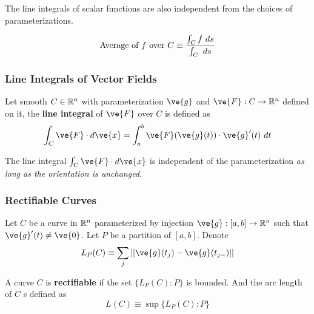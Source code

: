 \documentclass[11pt]{article}
\begin{document}
			\begin{remark}
				The line integrals of scalar functions are also independent from the choices of parameterizations.
			\end{remark}
			
			\begin{definition}
				\begin{equation}
					\text{{Average of $f$ over $C$}} \equiv \frac{\int_C f\ ds}{\int_C\ ds}
				\end{equation}
			\end{definition}
			
		\subsubsection{Line Integrals of Vector Fields}
			\begin{definition} Let smooth $C \in \mathbb{R}^n$ with parameterization $\ve{g}$ and $\ve{F}: C \to \R^n$ defined on it, the \textbf{line integral} of $\ve{F}$ over $C$ is defined as 
				\begin{equation}
					\int_C \ve{F}\cdot d\ve{x} = \int_a^b \ve{F}(\ve{g}(t)) \cdot \ve{g}'(t)\ dt
				\end{equation}
			\end{definition}
			
			\begin{proposition}
				The line integral $\int_C \ve{F}\cdot d\ve{x}$ is independent of the parameterization \emph{as long as the orientation is unchanged}.
			\end{proposition}
			
		\subsubsection{Rectifiable Curves}
			\begin{remark}
				Let $C$ be a curve in $\mathbb{R}^n$ parameterized by injection $\ve{g}: [a, b] \to \R^n$ such that $\ve{g}'(t) \neq \ve{0}$. Let $P$ be a partition of $[a, b]$. Denote
				\begin{equation}
					L_P(C) \equiv \sum_{j} ||\ve{g}(t_j) - \ve{g}(t_{j-})||
				\end{equation}
			\end{remark}
			
			\begin{definition}
				A curve $C$ is \textbf{rectifiable} if the set $\{L_P(C):P\}$ is bounded. And the arc length of $C$ s defined as 
				\begin{equation}
					L(C) \equiv \sup \{L_P(C):P\}
				\end{equation}
			\end{definition}
			
\end{document}
